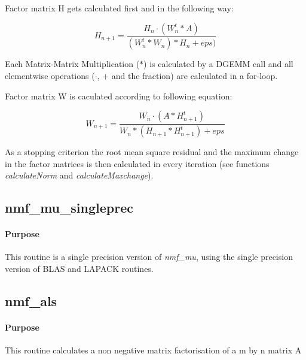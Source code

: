 \documentclass[a4paper,10pt]{scrartcl}
\begin{document}
					Factor matrix H gets calculated first and in the following way:\newline

					\begin{equation*}
						H_{n+1} = \dfrac{H_{n} \cdot (W_{n}^t * A)}{(W_n^t * W_n)* H_n + eps)} 
					\end{equation*}

					Each Matrix-Matrix Multiplication ($*$) is calculated by a DGEMM call and
					all elementwise operations ($\cdot$, $+$ and the fraction) are calculated
					in a for-loop.\newline

					Factor matrix W is caculated according to following equation:\newline
					
					\begin{equation*}
						W_{n+1} = \dfrac{W_{n} \cdot (A * H_{n+1}^t)}{W_n * (H_{n+1}* H_{n+1}^t) + eps}
					\end{equation*}


					As a stopping criterion the root mean square residual and the maximum 
					change in the factor matrices is then calculated in every iteration (see
					functions \emph{calculateNorm} and \emph{calculateMaxchange}).\newline



		\subsection{nmf\_mu\_singleprec}

			\paragraph{Purpose}

					This routine is a single precision version of \emph{nmf\_mu}, using the single
					precision version of BLAS and LAPACK routines.



		\subsection{nmf\_als}

			\paragraph{Purpose}

					This routine calculates a non negative matrix factorisation of a m by n 
					matrix A\newline
					
\end{document}
